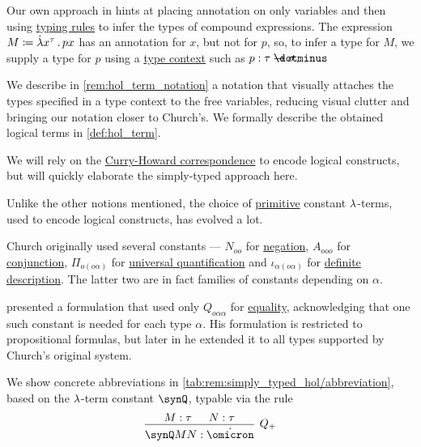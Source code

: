 \begin{remark}
\begin{thmenum}
    Our own approach in  hints at placing annotation on only variables and then using \hyperref[con:typing_rule]{typing rules} to infer the types of compound expressions. The expression \( M \coloneqq \qabs {x^\tau} {p x} \) has an annotation for \( x \), but not for \( p \), so, to infer a type for \( M \), we supply a type for \( p \) using a \hyperref[def:type_context]{type context} such as \( p: \tau \synimplies \sigma \).

    We describe in \cref{rem:hol_term_notation} a notation that visually attaches the types specified in a type context to the free variables, reducing visual clutter and bringing our notation closer to Church's. We formally describe the obtained logical terms in \cref{def:hol_term}.

     We will rely on the \hyperref[con:curry_howard_correspondence]{Curry-Howard correspondence} to encode logical constructs, but will quickly elaborate the simply-typed approach here.

    Unlike the other notions mentioned, the choice of \hyperref[con:primitive_notion]{primitive} constant \( {\mathrm \lambda} \)-terms, used to encode logical constructs, has evolved a lot.

    Church originally used several constants --- \( N_{oo} \) for \hyperref[def:propositional_alphabet/negation]{negation}, \( A_{ooo} \) for \hyperref[def:propositional_alphabet/connectives/conjunction]{conjunction}, \( \Pi_{o(o\alpha)} \) for \hyperref[def:predicate_logic_alphabet/quantifiers/universal]{universal quantification} and \( \iota_{\alpha(o\alpha)} \) for \hyperref[con:denotation/iota]{definite description}. The latter two are in fact families of constants depending on \( \alpha \).

     presented a formulation that used only \( Q_{o \alpha \alpha } \) for \hyperref[def:predicate_logic_alphabet/equality]{equality}, acknowledging that one such constant is needed for each type \( \alpha \). His formulation is restricted to propositional formulas, but later in \cite{Henkin1975Identity} he extended it to all types supported by Church's original system.

    We show concrete abbreviations in \cref{tab:rem:simply_typed_hol/abbreviation}, based on the \( {\mathrm \lambda} \)-term constant \( \synQ \), typable via the rule
    \begin{equation*}
      \begin{prooftree}
        \hypo{ M: \tau }
        \hypo{ N: \tau }
        \infer2[\ensuremath{ Q_+ }]{ \synQ M N: \syn\omicron }
      \end{prooftree}
    \end{equation*}


\end{thmenum}
\end{remark}
